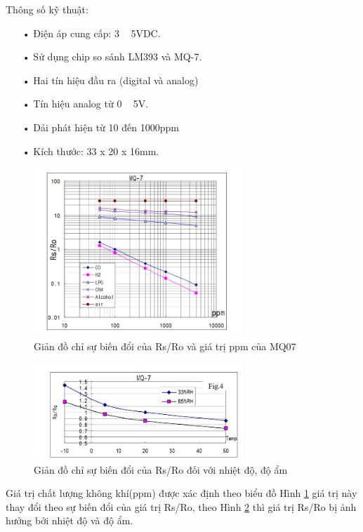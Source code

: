 Thông số kỹ thuật:
\begin{itemize}
\item[•]Điện áp cung cấp: 3 ~ 5VDC.
\item[•]Sử dụng chip so sánh LM393 và MQ-7.
\item[•]Hai tín hiệu đầu ra (digital và analog)
\item[•]Tín hiệu analog từ 0 ~ 5V.
\item[•]Dải phát hiện từ 10 đến 1000ppm
\item[•]Kích thước: 33 x 20 x 16mm.
\end{itemize}
\begin{figure}[H]
\centering    
\includegraphics[width=0.7\textwidth]{mq07_mqh1}
\caption[Giản đồ chỉ sự biến đổi của Rs/Ro và giá trị ppm của MQ07]{Giản đồ chỉ sự biến đổi của Rs/Ro và giá trị ppm của MQ07}
\label{fig:mq07_mqh1}
\end{figure}


\begin{figure}[H]
\centering    
\includegraphics[width=0.7\textwidth]{mq07_mqh2}
\caption[Giản đồ chỉ sự biến đổi của Rs/Ro đối với nhiệt độ, độ ẩm]{Giản đồ chỉ sự biến đổi của Rs/Ro đối với nhiệt độ, độ ẩm}
\label{fig:mq07_mqh2}
\end{figure}


Giá trị chất lượng không khí(ppm) được xác định theo biểu đồ Hình \ref{fig:mq07_mqh1} giá trị này thay đổi theo sự biến đổi của giá trị Rs/Ro, theo Hình \ref{fig:mq07_mqh2} thì giá trị Rs/Ro bị ảnh hưởng bởi nhiệt độ và độ ẩm.


